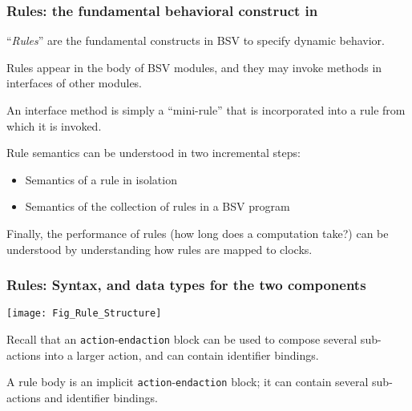 \begin{frame}[fragile]
\frametitle{Rules: the fundamental behavioral construct in {\BSV}}

\footnotesize

``\emph{Rules}'' are the fundamental constructs in BSV to specify
dynamic behavior.

\vspace{2ex}

Rules appear in the body of BSV modules, and they may invoke methods
in interfaces of other modules.

\vspace{2ex}

An interface method is simply a ``mini-rule'' that is incorporated
into a rule from which it is invoked.

\PAUSE{\vspace{5ex}}

Rule semantics can be understood in two incremental steps:

\begin{itemize}

 \item Semantics of a rule in isolation

 \item Semantics of the collection of rules in a BSV program

\end{itemize}

\PAUSE{\vspace{5ex}}

Finally, the performance of rules (how long does a computation take?)
can be understood by understanding how rules are mapped to clocks.

\end{frame}


\begin{frame}[fragile]
\frametitle{Rules: Syntax, and data types for the two components}

\footnotesize

\begin{center}
 \texttt{[image: Fig\_Rule\_Structure]}
\end{center}

\vspace{5ex}

Recall that an {\tt action}-{\tt endaction} block can be used to
compose several sub-actions into a larger action, and can contain
identifier bindings.

\vspace{1ex}

A rule body is an implicit {\tt action}-{\tt endaction} block; it can
contain several sub-actions and identifier bindings.

\end{frame}

